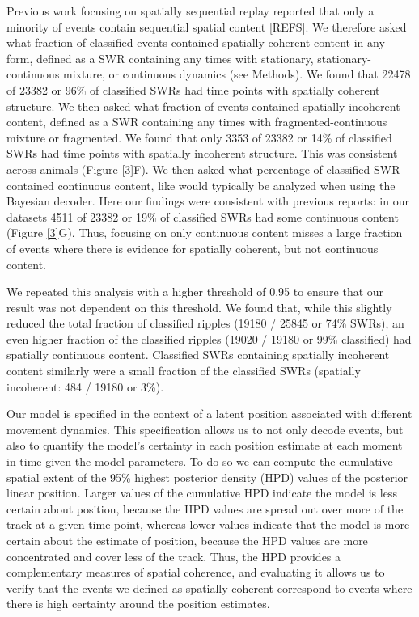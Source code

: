 \documentclass[times, twoside]{zHenriquesLab-StyleBioRxiv}
\begin{document}
Previous work focusing on spatially sequential replay reported that only a minority of events contain sequential spatial content [REFS]. We therefore asked what fraction of classified events contained spatially coherent content in any form, defined as a SWR containing any times with stationary, stationary-continuous mixture, or continuous dynamics (see Methods). We found that 22478 of 23382 or 96\% of classified SWRs had time points with spatially coherent structure. We then asked what fraction of events contained spatially incoherent content, defined as a SWR containing any times with fragmented-continuous mixture or fragmented. We found that only 3353 of 23382 or 14\% of classified SWRs had time points with spatially incoherent structure. This was consistent across animals (Figure \ref{3}F). We then asked what percentage of classified SWR contained continuous content, like would typically be analyzed when using the Bayesian decoder. Here our findings were consistent with previous reports: in our datasets 4511 of 23382 or 19\% of classified SWRs had some continuous content (Figure \ref{3}G). Thus, focusing on only continuous content misses a large fraction of events where there is evidence for spatially coherent, but not continuous content.

We repeated this analysis with a higher threshold of 0.95 to ensure that our result was not dependent on this threshold. We found that, while this slightly reduced the total fraction of classified ripples (19180 / 25845 or 74\% SWRs), an even higher fraction of the classified ripples (19020 / 19180 or 99\% classified) had spatially continuous content. Classified SWRs containing spatially incoherent content similarly were a small fraction of the classified SWRs (spatially incoherent: 484 / 19180 or 3\%).

Our model is specified in the context of a latent position associated with different movement dynamics. This specification allows us to not only decode events, but also to quantify the model's certainty in each position estimate at each moment in time given the model parameters. To do so we can compute the cumulative spatial extent of the 95\% highest posterior density (HPD) values of the posterior linear position. Larger values of the cumulative HPD indicate the model is less certain about position, because the HPD values are spread out over more of the track at a given time point, whereas lower values indicate that the model is more certain about the estimate of position, because the HPD values are more concentrated and cover less of the track. Thus, the HPD provides a complementary measures of spatial coherence, and evaluating it allows us to verify that the events we defined as spatially coherent correspond to events where there is high certainty around the position estimates.
\end{document}
